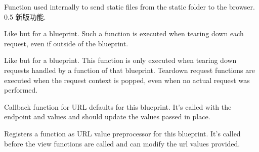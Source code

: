 \documentclass[a4paper,12pt]{sphinxmanual}
\begin{document}
\begin{fulllineitems}
\begin{fulllineitems}
\end{fulllineitems}


\begin{fulllineitems}
\label{api:flask.Blueprint.send_static_file}
Function used internally to send static files from the static
folder to the browser.
0.5 新版功能.
\end{fulllineitems}


\begin{fulllineitems}
\label{api:flask.Blueprint.teardown_app_request}
Like {\hyperref[api:flask.Flask.teardown_request]{}} but for a blueprint.  Such a
function is executed when tearing down each request, even if outside of
the blueprint.

\end{fulllineitems}


\begin{fulllineitems}
\label{api:flask.Blueprint.teardown_request}
Like {\hyperref[api:flask.Flask.teardown_request]{}} but for a blueprint.  This
function is only executed when tearing down requests handled by a
function of that blueprint.  Teardown request functions are executed
when the request context is popped, even when no actual request was
performed.

\end{fulllineitems}


\begin{fulllineitems}
\label{api:flask.Blueprint.url_defaults}
Callback function for URL defaults for this blueprint.  It's called
with the endpoint and values and should update the values passed
in place.

\end{fulllineitems}


\begin{fulllineitems}
\label{api:flask.Blueprint.url_value_preprocessor}
Registers a function as URL value preprocessor for this
blueprint.  It's called before the view functions are called and
can modify the url values provided.

\end{fulllineitems}


\end{fulllineitems}
\end{document}
